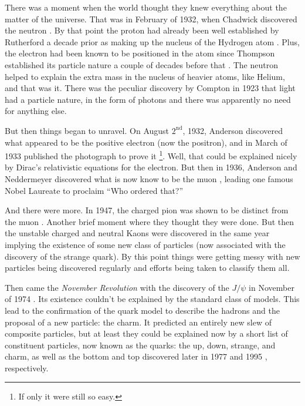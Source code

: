 There was a moment when the world thought they knew everything
about the matter of the universe. That was in February of 1932, when Chadwick discovered the
neutron \cite{Chadwick:1932ma}. By that point the proton had already been 
well established by Rutherford a decade prior as 
making up the nucleus of the Hydrogen
atom \cite{Rutherford:1911zz}. 
Plus, the electron had been known to be positioned in the atom
since Thompson established its particle nature a couple of decades before
that \cite{thompson:electron}. 
The neutron helped to explain the extra mass in the nucleus of heavier
atoms, like Helium, and that was it. There was the peculiar discovery 
by Compton in 1923 \cite{PhysRev.21.483} 
that light had a particle nature, in the form of photons
and there was apparently no need for anything else. 


But then things began to unravel. On August $2^{\textrm{nd}}$, 1932, Anderson
discovered what appeared to be the positive electron (now the positron), 
and in March of 1933 published 
the photograph to prove it \cite{PhysRev.43.491}\footnote{If only it were still so easy.}. 
Well, that could be explained nicely by Dirac's relativistic equations
for the electron. But then in 1936, Anderson and Neddermeyer discovered
what is now know to be the muon \cite{PhysRev.51.884}, 
leading one famous Nobel Laureate
to proclaim ``Who ordered that?'' 

And there were more.
In 1947, the charged pion was shown to be distinct 
from the muon \cite{Lattes:1947my}.
Another brief moment where they thought they were done. But then the unstable
charged and neutral Kaons were discovered in the 
same year \cite{Rochester:1947mi} implying
the existence of some new class of particles (now associated with the discovery 
of the strange quark). By this point things were getting messy with new particles
being discovered regularly and efforts being taken to classify them all.


Then came the \emph{November Revolution} with the discovery 
of the $J/\psi$ in November of 1974 \cite{PhysRevLett.33.1404,PhysRevLett.33.1453}.
Its existence couldn't be explained by the standard class 
of models.  This lead 
to the confirmation of the 
quark model to describe the hadrons and the proposal of a new particle: the charm.  
It predicted an entirely new slew of composite particles, but at least 
they could be explained
now by a short list of constituent particles, now known as the 
quarks: the up, down,
strange, and charm, as well as the bottom and top discovered later in 
1977 \cite{Herb:1977ek}
and 1995 \cite{PhysRevLett.74.2632,PhysRevLett.74.2626}, respectively.


